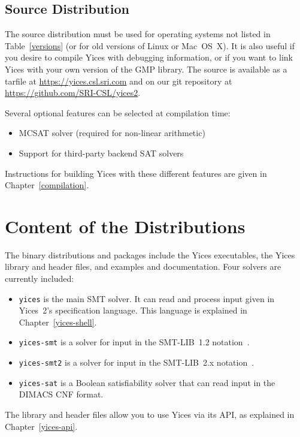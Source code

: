 \documentclass[11pt,twoside,fleqn,openright,titlepage]{cslreport}
\begin{document}
\subsection{Source Distribution}

The source distribution must be used for operating systems not listed
in Table~\ref{versions} (or for old versions of Linux or Mac~OS~X). It
is also useful if you desire to compile Yices with debugging
information, or if you want to link Yices with your own version of the
GMP library.
The source is available as a tarfile at
\url{https://yices.csl.sri.com} and on our git repository at
\url{https://github.com/SRI-CSL/yices2}.

\medskip\noindent
Several optional features can be selected at compilation time:
\begin{itemize}
\item MCSAT solver (required for non-linear arithmetic)
\item Support for third-party backend SAT solvers
\end{itemize}
Instructions for building Yices with these different features are given in Chapter~\ref{compilation}.



\section{Content of the Distributions}

The binary distributions and packages include the Yices executables,
the Yices library and header files, and examples and documentation.
Four solvers are currently included:
\begin{itemize}
\item \texttt{yices} is  the main SMT solver. It  can read and process
  input given  in Yices~2's  specification language. This  language is
  explained in Chapter~\ref{yices-shell}.

\item  \texttt{yices-smt} is  a solver  for input  in  the SMT-LIB~1.2
  notation~\cite{SMTLIB12:2006}.

\item \texttt{yices-smt2} is a solver for input in the SMT-LIB~2.x
  notation~\cite{SMTLIB25:2015}.

\item \texttt{yices-sat}  is a Boolean satisfiability  solver that can
  read input in the DIMACS CNF format.
\end{itemize}
The library and header files allow you to use Yices via its API, as
explained in Chapter~\ref{yices-api}.
\end{document}
